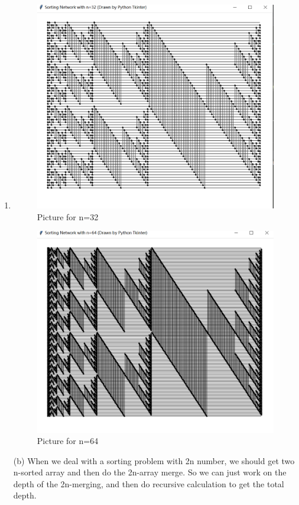 \documentclass[12pt,a4paper]{article}
\makeatletter
\newtheorem*{solution}{Solution}
\theoremstyle{definition}
\renewenvironment{solution}[1][Solution] {\par\pushQED{\qed}\normalfont\topsep6\p@\@plus6\p@\relax\trivlist\item[\hskip\labelsep\bfseries#1\@addpunct{.}]\ignorespaces}{\popQED\endtrivlist\@endpefalse} \makeatother
\makeatother
\begin{document}
\begin{enumerate}
\begin{solution}
		\begin{figure}[htbp]
			\centering
			\includegraphics[width=12cm]{32.PNG}
			\caption{Picture for n=32 }
			\label{fig3}
		\end{figure} 
	
	\begin{figure}[htbp]
		\centering
		\includegraphics[width=12cm]{64.PNG}
		\caption{Picture for n=64}
		\label{fig4}
	\end{figure} 


	(b) When we deal with a sorting problem with 2n number, we should get two n-sorted array and then do the 2n-array merge.
	So we can just work on the depth of the 2n-merging, and then do recursive calculation to get the total depth.
	

\end{solution}
\end{enumerate}
\end{document}
